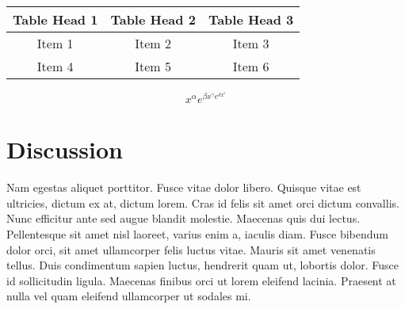 \documentclass[
  10pt,
  a4paper,
]{article}
\begin{document}
\begin{longtable}[]{@{}ccc@{}}
\toprule
\textbf{Table Head 1} & \textbf{Table Head 2} & \textbf{Table Head
3}\tabularnewline
\midrule
\endhead
Item 1 & Item 2 & Item 3\tabularnewline
Item 4 & Item 5 & Item 6\tabularnewline
\bottomrule
\end{longtable}

\[x^{\alpha} e^{\beta x^{\gamma} e^{\delta x^{\epsilon}}}\]

\hypertarget{discussion}{%
\section{Discussion}\label{discussion}}

Nam egestas aliquet porttitor. Fusce vitae dolor libero. Quisque vitae
est ultricies, dictum ex at, dictum lorem. Cras id felis sit amet orci
dictum convallis. Nunc efficitur ante sed augue blandit molestie.
Maecenas quis dui lectus. Pellentesque sit amet nisl laoreet, varius
enim a, iaculis diam. Fusce bibendum dolor orci, sit amet ullamcorper
felis luctus vitae. Mauris sit amet venenatis tellus. Duis condimentum
sapien luctus, hendrerit quam ut, lobortis dolor. Fusce id sollicitudin
ligula. Maecenas finibus orci ut lorem eleifend lacinia. Praesent at
nulla vel quam eleifend ullamcorper ut sodales mi.

\renewcommand\refname{References}
  
\end{document}
